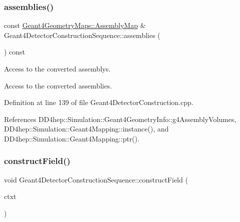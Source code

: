 \subsubsection{\texorpdfstring{assemblies()}{assemblies()}}
{\footnotesize\ttfamily const \hyperlink{namespace_d_d4hep_1_1_simulation_1_1_geant4_geometry_maps_ae1f67e315dd299b17e4ea1c58a47b312}{Geant4\+Geometry\+Maps\+::\+Assembly\+Map} \& Geant4\+Detector\+Construction\+Sequence\+::assemblies (\begin{DoxyParamCaption}{ }\end{DoxyParamCaption}) const}



Access to the converted assemblys. 

Access to the converted assemblies. 

Definition at line 139 of file Geant4\+Detector\+Construction.\+cpp.



References D\+D4hep\+::\+Simulation\+::\+Geant4\+Geometry\+Info\+::g4\+Assembly\+Volumes, D\+D4hep\+::\+Simulation\+::\+Geant4\+Mapping\+::instance(), and D\+D4hep\+::\+Simulation\+::\+Geant4\+Mapping\+::ptr().

\hypertarget{class_d_d4hep_1_1_simulation_1_1_geant4_detector_construction_sequence_a74d488648a50cae0230ca9dedf678160}{}\label{class_d_d4hep_1_1_simulation_1_1_geant4_detector_construction_sequence_a74d488648a50cae0230ca9dedf678160} 
\subsubsection{\texorpdfstring{construct\+Field()}{constructField()}}
{\footnotesize\ttfamily void Geant4\+Detector\+Construction\+Sequence\+::construct\+Field (\begin{DoxyParamCaption}\item[{\hyperlink{class_d_d4hep_1_1_simulation_1_1_geant4_detector_construction_context}{Geant4\+Detector\+Construction\+Context} $\ast$}]{ctxt }\end{DoxyParamCaption})\hspace{0.3cm}{\ttfamily [virtual]}}



